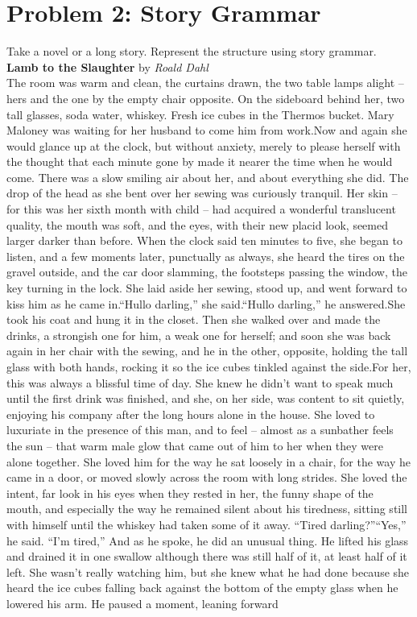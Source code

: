 \documentclass[11pt,a4paper]{article}
\begin{document}
	\section{Problem 2: Story Grammar}
	Take a novel or a long story. Represent the structure using story grammar.\\	
	$ $\\
	$ $\\
	$ $\\
	\textbf{Lamb to the Slaughter} by \textit{Roald Dahl}\\
	$ $\\	
	{\bg
		The room was warm and clean, the curtains drawn, the two table lamps alight – hers and the one by the empty chair opposite. On the sideboard behind her, two tall glasses, soda water, whiskey. Fresh ice cubes in the Thermos bucket. Mary Maloney was waiting for her husband to come him from work.Now and again she would glance up at the clock, but without anxiety, merely to please herself with the thought that each minute gone by made it nearer the time when he would come. There was a slow smiling air about her, and about everything she did. The drop of the head as she bent over her sewing was curiously tranquil. Her skin – for this was her sixth month with child – had acquired a wonderful translucent quality, the mouth was soft, and the eyes, with their new placid look, seemed larger darker than before. When the clock said ten minutes to five, she began to listen, and a few moments later, punctually as always, she heard the tires on the gravel outside, and the car door slamming, the footsteps passing the window, the key turning in the lock. She laid aside her sewing, stood up, and went forward to kiss him as he came in.“Hullo darling,” she said.“Hullo darling,” he answered.She took his coat and hung it in the closet. Then she walked over and made the drinks, a strongish one for him, a weak one for herself; and soon she was back again in her chair with the sewing, and he in the other, opposite, holding the tall glass with both hands, rocking it so the ice cubes tinkled against the side.For her, this was always a blissful time of day. She knew he didn’t want to speak much until the first drink was finished, and she, on her side, was content to sit quietly, enjoying his company after the long hours alone in the house. She loved to luxuriate in the presence of this man, and to feel – almost as a sunbather feels the sun – that warm male glow that came out of him to her when they were alone together. She loved him for the way he sat loosely in a chair, for the way he came in a door, or moved slowly across the room with long strides. She loved the intent, far look in his eyes when they rested in her, the funny shape of the mouth, and especially the way he remained silent about his tiredness, sitting still with himself until the whiskey had taken some of it away. “Tired darling?”“Yes,” he said. “I’m tired,” And as he spoke, he did an unusual thing. He lifted his glass and drained it in one swallow although there was still half of it, at least half of it left. She wasn’t really watching him, but she knew what he had done because she heard the ice cubes falling back against the bottom of the empty glass when he lowered his arm. He paused a moment, leaning forward }
\end{document}
